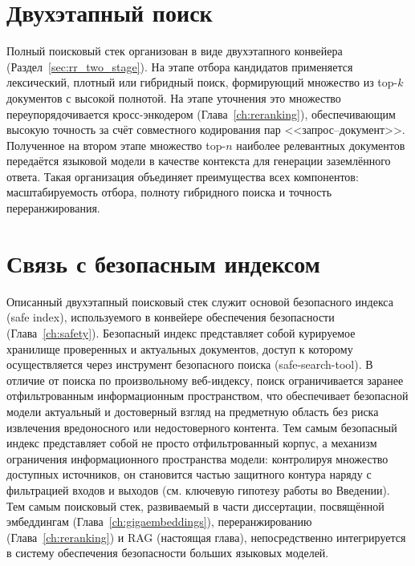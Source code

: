 \section{Двухэтапный поиск}\label{sec:rag_two_stage}

Полный поисковый стек организован в виде двухэтапного конвейера (Раздел~\ref{sec:rr_two_stage}).
На этапе отбора кандидатов применяется лексический, плотный или гибридный поиск, формирующий множество из top-$k$ документов с высокой полнотой.
На этапе уточнения это множество переупорядочивается кросс-энкодером (Глава~\ref{ch:reranking}), обеспечивающим высокую точность за счёт совместного кодирования пар <<запрос--документ>>.
Полученное на втором этапе множество top-$n$ наиболее релевантных документов передаётся языковой модели в качестве контекста для генерации заземлённого ответа.
Такая организация объединяет преимущества всех компонентов: масштабируемость отбора, полноту гибридного поиска и точность переранжирования.

\section{Связь с безопасным индексом}\label{sec:rag_safe_index}

Описанный двухэтапный поисковый стек служит основой безопасного индекса (safe index), используемого в конвейере обеспечения безопасности (Глава~\ref{ch:safety}).
Безопасный индекс представляет собой курируемое хранилище проверенных и актуальных документов, доступ к которому осуществляется через инструмент безопасного поиска (safe-search-tool).
В отличие от поиска по произвольному веб-индексу, поиск ограничивается заранее отфильтрованным информационным пространством, что обеспечивает безопасной модели актуальный и достоверный взгляд на предметную область без риска извлечения вредоносного или недостоверного контента.
Тем самым безопасный индекс представляет собой не просто отфильтрованный корпус, а механизм ограничения информационного пространства модели: контролируя множество доступных источников, он становится частью защитного контура наряду с фильтрацией входов и выходов (см. ключевую гипотезу работы во Введении).
Тем самым поисковый стек, развиваемый в части диссертации, посвящённой эмбеддингам (Глава~\ref{ch:gigaembeddings}), переранжированию (Глава~\ref{ch:reranking}) и RAG (настоящая глава), непосредственно интегрируется в систему обеспечения безопасности больших языковых моделей.

